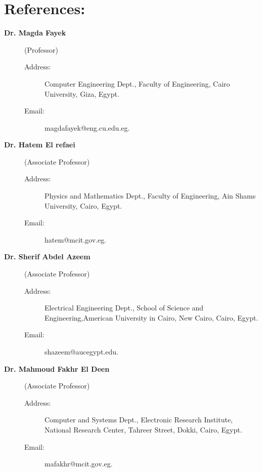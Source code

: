 \documentclass{article}
\begin{document}
\section*{References:}
\begin{description}

\item[\textbf{Dr. Magda Fayek}] (Professor)

\begin{description}
  \item[Address:]Computer Engineering Dept., Faculty of Engineering, Cairo University, Giza, Egypt.
  \item[Email:] magdafayek@eng.cu.edu.eg.
\end{description}
\item[\textbf{Dr. Hatem El refaei}] (Associate Professor)

\begin{description}
  \item[Address:]Physics and Mathematics Dept., Faculty of Engineering, Ain Shams University, Cairo, Egypt.
  \item[Email:]hatem@mcit.gov.eg.
\end{description}


\item[\textbf{Dr. Sherif Abdel Azeem}] (Associate Professor)

\begin{description}
  \item[Address:]Electrical Engineering Dept., School of Science and Engineering,American University in Cairo, New Cairo, Cairo, Egypt.
  \item[Email:]  shazeem@aucegypt.edu.
\end{description}

\item[ \textbf{Dr. Mahmoud Fakhr El Deen}] (Associate Professor)

 \begin{description}
  \item[Address:]Computer and Systems Dept., Electronic Research Institute,
  National Research Center, Tahreer Street, Dokki, Cairo, Egypt.
  \item[Email:]mafakhr@mcit.gov.eg.
\end{description}
\end{description}
 
\end{document}
